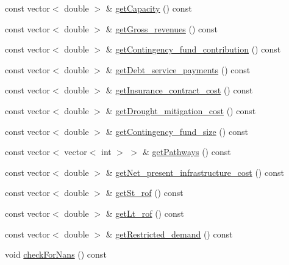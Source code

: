 \begin{DoxyCompactItemize}
\item 
const vector$<$ double $>$ \& \mbox{\hyperlink{classUtilitiesDataCollector_a60777cdd34af760348ca62d24b57be48_a60777cdd34af760348ca62d24b57be48}{get\+Capacity}} () const
\item 
const vector$<$ double $>$ \& \mbox{\hyperlink{classUtilitiesDataCollector_acdfb52a6c46cc891f48296565538966f_acdfb52a6c46cc891f48296565538966f}{get\+Gross\+\_\+revenues}} () const
\item 
const vector$<$ double $>$ \& \mbox{\hyperlink{classUtilitiesDataCollector_ab699a97a328339a25b848593ab74ad0b_ab699a97a328339a25b848593ab74ad0b}{get\+Contingency\+\_\+fund\+\_\+contribution}} () const
\item 
const vector$<$ double $>$ \& \mbox{\hyperlink{classUtilitiesDataCollector_a7e5dce8713ac981d00880349136a4eed_a7e5dce8713ac981d00880349136a4eed}{get\+Debt\+\_\+service\+\_\+payments}} () const
\item 
const vector$<$ double $>$ \& \mbox{\hyperlink{classUtilitiesDataCollector_af71c346629fb5e70c8c72a4c9021bd0c_af71c346629fb5e70c8c72a4c9021bd0c}{get\+Insurance\+\_\+contract\+\_\+cost}} () const
\item 
const vector$<$ double $>$ \& \mbox{\hyperlink{classUtilitiesDataCollector_aa76522a5400395bb3bf73512996dcccb_aa76522a5400395bb3bf73512996dcccb}{get\+Drought\+\_\+mitigation\+\_\+cost}} () const
\item 
const vector$<$ double $>$ \& \mbox{\hyperlink{classUtilitiesDataCollector_a0533e321af5487a24c1721ae62b8f0c6_a0533e321af5487a24c1721ae62b8f0c6}{get\+Contingency\+\_\+fund\+\_\+size}} () const
\item 
const vector$<$ vector$<$ int $>$ $>$ \& \mbox{\hyperlink{classUtilitiesDataCollector_ab87447b4f0e8c1d698830d08b9fcf04d_ab87447b4f0e8c1d698830d08b9fcf04d}{get\+Pathways}} () const
\item 
const vector$<$ double $>$ \& \mbox{\hyperlink{classUtilitiesDataCollector_a1966229d608eb5ba0c87307fb9aaaffe_a1966229d608eb5ba0c87307fb9aaaffe}{get\+Net\+\_\+present\+\_\+infrastructure\+\_\+cost}} () const
\item 
const vector$<$ double $>$ \& \mbox{\hyperlink{classUtilitiesDataCollector_aa79cd7f8b1390abed3e6f85a20d503a0_aa79cd7f8b1390abed3e6f85a20d503a0}{get\+St\+\_\+rof}} () const
\item 
const vector$<$ double $>$ \& \mbox{\hyperlink{classUtilitiesDataCollector_aa69490f96d65e0fd8418c13e6d6b2143_aa69490f96d65e0fd8418c13e6d6b2143}{get\+Lt\+\_\+rof}} () const
\item 
const vector$<$ double $>$ \& \mbox{\hyperlink{classUtilitiesDataCollector_ad4a8d3c75aa8365d54abcb711ade26db_ad4a8d3c75aa8365d54abcb711ade26db}{get\+Restricted\+\_\+demand}} () const
\item 
void \mbox{\hyperlink{classUtilitiesDataCollector_af01392bbfae02a1fd9ee65b3c97a73a3_af01392bbfae02a1fd9ee65b3c97a73a3}{check\+For\+Nans}} () const
\end{DoxyCompactItemize}
